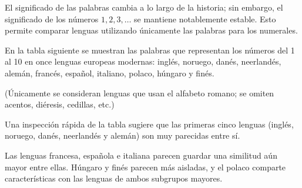 \documentclass[
]{book}
\begin{document}
El significado de las palabras cambia a lo largo de la historia; sin embargo, el significado de los números \(1,2,3,\dots\) se mantiene notablemente estable. Esto permite comparar lenguas utilizando únicamente las palabras para los numerales.

En la tabla siguiente se muestran las palabras que representan los números del 1 al 10 en once lenguas europeas modernas: inglés, noruego, danés, neerlandés, alemán, francés, español, italiano, polaco, húngaro y finés.

(Únicamente se consideran lenguas que usan el alfabeto romano; se omiten acentos, diéresis, cedillas, etc.)

Una inspección rápida de la tabla sugiere que las primeras cinco lenguas (inglés, noruego, danés, neerlandés y alemán) son muy parecidas entre sí.

Las lenguas francesa, española e italiana parecen guardar una similitud aún mayor entre ellas.
Húngaro y finés parecen más aisladas, y el polaco comparte características con las lenguas de ambos subgrupos mayores.
\end{document}
